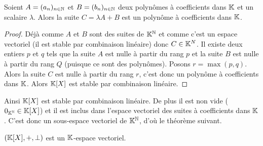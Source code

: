 \begin{lemme}
  Soient \(A=(a_n)_{n \in \mathbb{N}}\) et \(B=(b_n)_{n \in \mathbb{N}}\) deux polynômes à 
  coefficients dans \(\mathbb{K}\) et un scalaire \(\lambda\). Alors la suite 
  \(C=\lambda A+B\) est un polynôme à coefficients dans \(\mathbb{K}\).
\end{lemme}
\begin{proof}
Déjà comme \(A\) et \(B\) sont des suites de \(\mathbb{K}^{\mathbb{N}}\) et comme c'est un espace 
vectoriel (il est stable par combinaison linéaire) donc \(C \in \mathbb{K}^N\). Il 
existe deux entiers \(p\) et \(q\) tels que la suite \(A\) est nulle à partir du 
rang \(p\) et la suite \(B\) est nulle à partir du rang \(Q\) (puisque ce sont 
des polynômes). Posons \(r=\max(p,q)\). Alors la suite \(C\) est nulle à partir 
du rang \(r\), c'est donc un polynôme à coefficients dans \(\mathbb{K}\). Alors 
\(\mathbb{K}[X]\) est stable par combinaison linéaire. \end{proof}

Ainsi \(\mathbb{K}[X]\) est stable par combinaison linéaire. De plus il est non vide 
(\(0_{\mathbb{K}^{\mathbb{N}}} \in \mathbb{K}[X]\)) et il est inclus dans l'espace vectoriel des suites à 
coefficients dans \(\mathbb{K}\). C'est donc un sous-espace vectoriel de \(\mathbb{K}^{\mathbb{N}}\), d'où 
le théorème suivant.

\begin{theo}
  \((\mathbb{K}[X], +, \perp)\) est un \(\mathbb{K}\)-espace vectoriel.
\end{theo}

